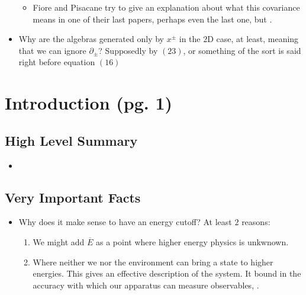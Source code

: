 \documentclass{article}
\newcommand{\cut}[1]{\overline{#1}}
\begin{document}
\begin{itemize}
\begin{itemize}
        \item Fiore and Pisacane try to give an explanation about what this covariance means in one of their last papers, perhaps even the last one, but .
        
        \end{itemize}
    
    \item Why are the algebras generated only by $x^\pm$ in the $2$D case, at least, meaning that we can ignore $\partial_\pm$? {\tiny Supposedly by $(23)$, or something of the sort is said right before equation $(16)$}
    
    
    \end{itemize}

\section{Introduction (pg. 1)}

\subsection*{High Level Summary}

    \begin{itemize}

    \item 
    
    \end{itemize}

\subsection*{Very Important Facts}

    \begin{itemize}

    \item Why does it make sense to have an energy cutoff? At least $2$ reasons:
    
        \begin{enumerate}
            
        \item We might add $\cut E$ as a point where higher energy physics is unkwnown.
        
        \item Where neither we nor the environment can bring a state to higher energies. This gives an effective description of the system. It  bound in the accuracy with which our apparatus can measure observables, .
            
        \end{enumerate}
    
    \end{itemize}
\end{document}

